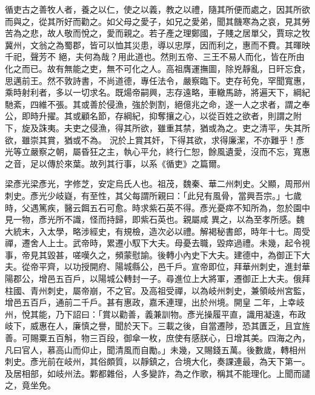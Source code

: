 
\begin{pinyinscope}

 循吏古之善牧人者，養之以仁，使之以義，教之以禮，隨其所便而處之，因其所欲而與之，從其所好而勸之。如父母之愛子，如兄之愛弟，聞其饑寒為之哀，見其勞苦為之悲，故人敬而悅之，愛而親之。若子產之理鄭國，子賤之居單父，賈琮之牧冀州，文翁之為蜀郡，皆可以恤其災患，導以忠厚，因而利之，惠而不費。其暉映千祀，聲芳不
 絕，夫何為哉？用此道也。然則五帝、三王不易人而化，皆在所由化之而已。故有無能之吏，無不可化之人。高祖膺運撫圖，除兇靜亂，日旰忘食，思邁前王。然不敦詩書，不尚道德，專任法令，嚴察臨下。吏存茍免，罕聞寬惠，乘時射利者，多以一切求名。既煬帝嗣興，志存遠略，車轍馬跡，將遍天下，綱紀馳紊，四維不張。其或善於侵漁，強於剝割，絕億兆之命，遂一人之求者，謂之奉公，即時升擢。其或顧名節，存綱紀，抑奪攘之心，以從百姓之欲者，則謂之附下，旋及誅夷。夫吏之侵漁，得其所欲，雖重其禁，猶或為之。吏之清平，失其所欲，雖崇其賞，猶或不為。
 況於上賞其奸，下得其欲，求得廉潔，不亦難乎！彥光等立嚴察之朝，屬昏狂之主，執心平允，終行仁恕，餘風遺愛，沒而不忘，寬惠之音，足以傳於來葉。故列其行事，以系《循吏》之篇爾。



 梁彥光梁彥光，字修芝，安定烏氏人也。祖茂，魏秦、華二州刺史。父顯，周邢州刺史。彥光少岐嶷，有至性，其父每謂所親曰：「此兒有風骨，當興吾宗。」七歲時，父遇篤疾，醫云餌五石可愈。時求紫石英不得。彥光憂瘁不知所為，忽於園中見一物，彥光所不識，怪而持歸，即紫石英也。親屬咸
 異之，以為至孝所感。魏大統末，入太學，略涉經史，有規檢，造次必以禮。解褐秘書郎，時年十七。周受禪，遷舍人上士。武帝時，累遷小馭下大夫。母憂去職，毀瘁過禮。未幾，起令視事，帝見其毀甚，嗟嘆久之，頻蒙慰諭。後轉小內史下大夫。建德中，為御正下大夫。從帝平齊，以功授開府、陽城縣公，邑千戶。宣帝即位，拜華州刺史，進封華陽郡公，增邑五百戶，以陽城公轉封一子。尋進位上大將軍，遷御正上大夫。俄拜柱國、青州刺史，屬帝崩，不之官。及高祖受禪，以為岐州刺史，兼領岐州宮監，增邑五百戶，通前二千戶。甚有惠政，嘉禾連理，出於州境。開皇
 二年，上幸岐州，悅其能，乃下詔曰：「賞以勸善，義兼訓物。彥光操履平直，識用凝遠，布政岐下，威惠在人，廉慎之譽，聞於天下。三載之後，自當遷陟，恐其匱乏，且宜旌善。可賜粟五百斛，物三百段，御傘一枚，庶使有感朕心，日增其美。四海之內，凡曰官人，慕高山而仰止，聞清風而自勵。」未幾，又賜錢五萬。後數歲，轉相州刺史。彥光前在岐州，其俗頗質，以靜鎮之，合境大化，奏課連最，為天下第一。及居相部，如岐州法。鄴都雜俗，人多變詐，為之作歌，稱其不能理化。上聞而譴之，竟坐免。




\end{pinyinscope}
